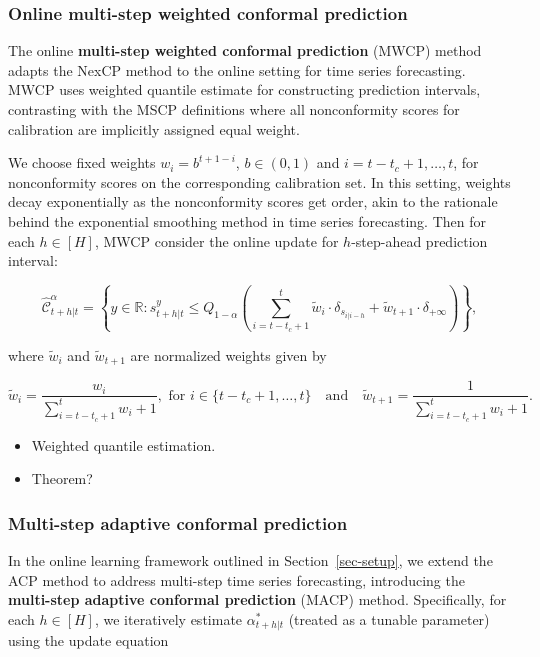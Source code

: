 \documentclass[
  11pt,
  a4paper,
]{article}
\theoremstyle{plain}
\theoremstyle{plain}
\theoremstyle{remark}
\begin{document}
\subsubsection{Online multi-step weighted conformal
prediction}\label{online-multi-step-weighted-conformal-prediction}

The online \textbf{multi-step weighted conformal prediction} (MWCP)
method adapts the NexCP method to the online setting for time series
forecasting. MWCP uses weighted quantile estimate for constructing
prediction intervals, contrasting with the MSCP definitions where all
nonconformity scores for calibration are implicitly assigned equal
weight.

We choose fixed weights \(w_i = b^{t+1-i}\), \(b \in (0, 1)\) and
\(i=t-t_c+1,\ldots,t\), for nonconformity scores on the corresponding
calibration set. In this setting, weights decay exponentially as the
nonconformity scores get order, akin to the rationale behind the
exponential smoothing method in time series forecasting. Then for each
\(h \in [H]\), MWCP consider the online update for \(h\)-step-ahead
prediction interval:

\[
\hat{\mathcal{C}}_{t+h|t}^{\alpha} = \left\{y\in\mathbb{R}: s_{t+h|t}^{y} \leq Q_{1-\alpha}\left(\sum_{i=t-t_c+1}^{t}\tilde{w}_i\cdot\delta_{s_{i|i-h}}+\tilde{w}_{t+1}\cdot\delta_{+\infty}\right)\right\},
\]

where \(\tilde{w}_i\) and \(\tilde{w}_{t+1}\) are normalized weights
given by

\[
\tilde{w}_i = \frac{w_i}{\sum_{i=t-t_c+1}^{t}w_i+1}, \text{ for } i \in \{t-t_c+1,\ldots,t\} \quad \text{and} \quad \tilde{w}_{t+1} =  \frac{1}{\sum_{i=t-t_c+1}^{t}w_i+1}.
\]

\begin{itemize}
\item
  Weighted quantile estimation.
\item
  Theorem?
\end{itemize}

\subsubsection{Multi-step adaptive conformal
prediction}\label{multi-step-adaptive-conformal-prediction}

In the online learning framework outlined in Section~\ref{sec-setup}, we
extend the ACP method to address multi-step time series forecasting,
introducing the \textbf{multi-step adaptive conformal prediction} (MACP)
method. Specifically, for each \(h \in [H]\), we iteratively estimate
\(\alpha_{t+h|t}^{*}\) (treated as a tunable parameter) using the update
equation
\end{document}
